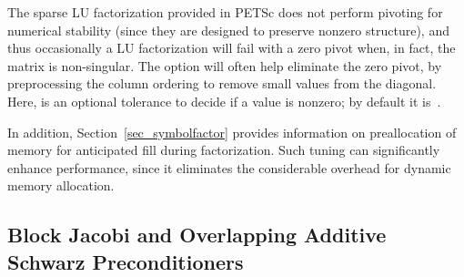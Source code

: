 The sparse LU factorization provided in PETSc does not perform pivoting for
numerical stability (since they are designed to preserve nonzero
structure), and thus occasionally a LU factorization will fail with a zero
pivot when, in fact, the matrix is non-singular. The option
 
will often help eliminate the zero pivot, by preprocessing the
column ordering to remove small values from the diagonal. Here, 
is an optional tolerance to decide if a value is nonzero; by default it
is~.

In addition, Section~\ref{sec_symbolfactor} provides information on
preallocation of memory for anticipated fill during factorization.
Such tuning can significantly enhance performance, since it
eliminates the considerable overhead for dynamic memory allocation.

\subsection{Block Jacobi and
            Overlapping Additive Schwarz Preconditioners}
\label{sec_bjacobi}

